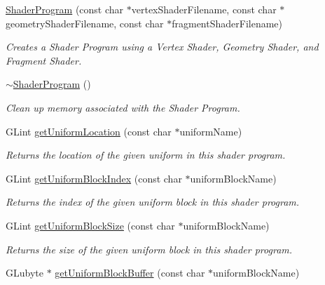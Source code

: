 \begin{DoxyCompactItemize}
\hyperlink{class_c_s_c_i441_1_1_shader_program_a1d1750c87ea740caf05dac2816a6b800}{Shader\+Program} (const char $\ast$vertex\+Shader\+Filename, const char $\ast$geometry\+Shader\+Filename, const char $\ast$fragment\+Shader\+Filename)
\begin{DoxyCompactList}\small\item\em Creates a Shader Program using a Vertex Shader, Geometry Shader, and Fragment Shader. \end{DoxyCompactList}\item 
\mbox{\label{class_c_s_c_i441_1_1_shader_program_a64b295be7ca8f309dfc085f8c0cf631a}} 
\hyperlink{class_c_s_c_i441_1_1_shader_program_a64b295be7ca8f309dfc085f8c0cf631a}{$\sim$\+Shader\+Program} ()
\begin{DoxyCompactList}\small\item\em Clean up memory associated with the Shader Program. \end{DoxyCompactList}\item 
G\+Lint \hyperlink{class_c_s_c_i441_1_1_shader_program_a196a95f51d3f85a32074ca7b0aba428f}{get\+Uniform\+Location} (const char $\ast$uniform\+Name)
\begin{DoxyCompactList}\small\item\em Returns the location of the given uniform in this shader program. \end{DoxyCompactList}\item 
G\+Lint \hyperlink{class_c_s_c_i441_1_1_shader_program_ab7e22eaa60f7ee098c8b9efc87de6397}{get\+Uniform\+Block\+Index} (const char $\ast$uniform\+Block\+Name)
\begin{DoxyCompactList}\small\item\em Returns the index of the given uniform block in this shader program. \end{DoxyCompactList}\item 
G\+Lint \hyperlink{class_c_s_c_i441_1_1_shader_program_a73f10d773f7ac81c92b899a8bd6826d8}{get\+Uniform\+Block\+Size} (const char $\ast$uniform\+Block\+Name)
\begin{DoxyCompactList}\small\item\em Returns the size of the given uniform block in this shader program. \end{DoxyCompactList}\item 
G\+Lubyte $\ast$ \hyperlink{class_c_s_c_i441_1_1_shader_program_a7a3246df6f87b0b4c7cfbce0a39e8330}{get\+Uniform\+Block\+Buffer} (const char $\ast$uniform\+Block\+Name)

\end{DoxyCompactItemize}
